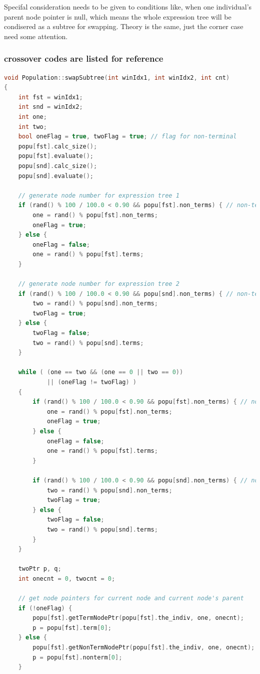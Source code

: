 \documentclass[10pt,b5paper]{article}
\begin{document}
Specifal consideration needs to be given to conditions like, when one individual's parent node pointer is null, which means the whole expression tree will be condisered as a subtree for swapping. Theory is the same, just the corner case need some attention. 
\subsubsection{crossover codes are listed for reference}
\label{sec-1-2-2}
\begin{lstlisting}[language=c++]
void Population::swapSubtree(int winIdx1, int winIdx2, int cnt) 
{
    int fst = winIdx1;
    int snd = winIdx2;
    int one;
    int two;
    bool oneFlag = true, twoFlag = true; // flag for non-terminal
    popu[fst].calc_size();
    popu[fst].evaluate();
    popu[snd].calc_size();
    popu[snd].evaluate();

    // generate node number for expression tree 1
    if (rand() % 100 / 100.0 < 0.90 && popu[fst].non_terms) { // non-terminal swap
        one = rand() % popu[fst].non_terms;
        oneFlag = true;  
    } else {    
        oneFlag = false;
        one = rand() % popu[fst].terms;
    }

    // generate node number for expression tree 2
    if (rand() % 100 / 100.0 < 0.90 && popu[snd].non_terms) { // non-terminal swap
        two = rand() % popu[snd].non_terms;
        twoFlag = true;
    } else {    
        twoFlag = false;
        two = rand() % popu[snd].terms;
    }
    
    while ( (one == two && (one == 0 || two == 0))
            || (oneFlag != twoFlag) )
    {
        if (rand() % 100 / 100.0 < 0.90 && popu[fst].non_terms) { // non-terminal swap
            one = rand() % popu[fst].non_terms;
            oneFlag = true;
        } else {    
            oneFlag = false;
            one = rand() % popu[fst].terms;
        }
    
        if (rand() % 100 / 100.0 < 0.90 && popu[snd].non_terms) { // non-terminal swap
            two = rand() % popu[snd].non_terms;
            twoFlag = true;
        } else {    
            twoFlag = false;
            two = rand() % popu[snd].terms;
        }
    }

    twoPtr p, q;
    int onecnt = 0, twocnt = 0;

    // get node pointers for current node and current node's parent
    if (!oneFlag) {        
        popu[fst].getTermNodePtr(popu[fst].the_indiv, one, onecnt);
        p = popu[fst].term[0];
    } else {        
        popu[fst].getNonTermNodePtr(popu[fst].the_indiv, one, onecnt);
        p = popu[fst].nonterm[0];
    }


\end{lstlisting}
\end{document}

